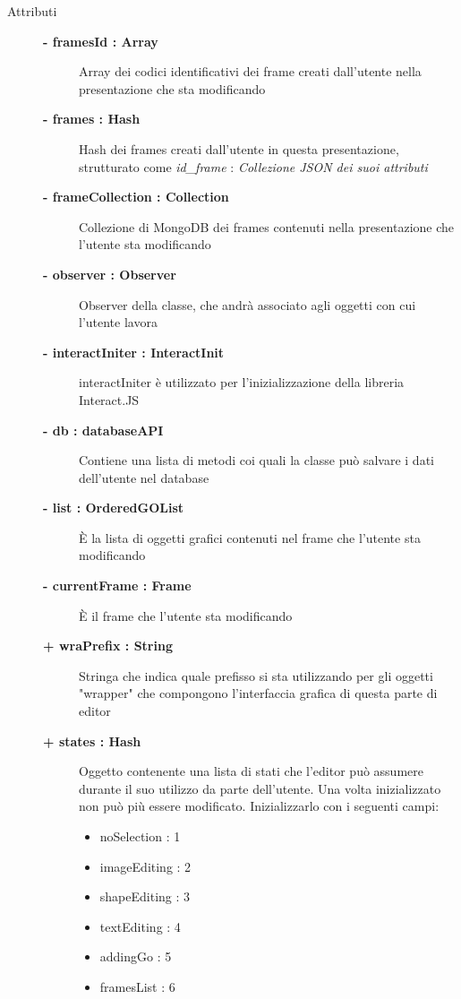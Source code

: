 \begin{description}
	
\item[Attributi] \hfill
	\begin{description}
		\item[\textbf{- framesId : Array			}] \hfill
			Array dei codici identificativi dei frame creati dall'utente nella presentazione che sta modificando
		\item[\textbf{- frames : Hash			}] \hfill
			Hash dei frames creati dall'utente in questa presentazione, strutturato come \textit{id\_frame} : \textit{Collezione JSON dei suoi attributi}
		\item[\textbf{- frameCollection : Collection			}] \hfill
			Collezione di MongoDB dei frames contenuti nella presentazione che l'utente sta modificando
		\item[\textbf{- observer : Observer			}] \hfill
			Observer della classe, che andrà associato agli oggetti con cui l'utente lavora
		\item[\textbf{- interactIniter : InteractInit			}] \hfill
			interactIniter è utilizzato per l'inizializzazione della libreria Interact.JS
		\item[\textbf{- db : databaseAPI			}] \hfill
			Contiene una lista di metodi coi quali la classe può salvare i dati dell'utente nel database
		\item[\textbf{- list : OrderedGOList			}] \hfill
			È la lista di oggetti grafici contenuti nel frame che l'utente sta modificando
		\item[\textbf{- currentFrame : Frame			}] \hfill
			È il frame che l'utente sta modificando
		\item[\textbf{+ wraPrefix : String			}] \hfill
			Stringa che indica quale prefisso si sta utilizzando per gli oggetti "wrapper" che compongono l'interfaccia grafica di questa parte di editor
		\item[\textbf{+ states : Hash			}] \hfill
			Oggetto contenente una lista di stati che l'editor può assumere durante il suo utilizzo da parte dell'utente. Una volta inizializzato non può più essere modificato. Inizializzarlo con i seguenti campi:
		\begin{itemize}
			\item noSelection : 1
			\item imageEditing : 2
			\item shapeEditing : 3
			\item textEditing : 4
			\item addingGo : 5
			\item framesList : 6
		\end{itemize}

\end{description}
\end{description}
